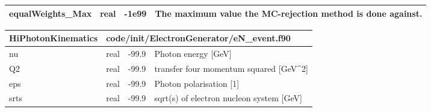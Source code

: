 \documentclass{article}
\begin{document}
\begin{longtable}{llll}
\midrule
equalWeights\_Max & \begin{minipage}[t]{2cm}real\end{minipage} & \begin{minipage}[t]{2cm}-1e99\end{minipage} & \begin{minipage}[t]{12cm}The maximum value the MC-rejection method is done against.\end{minipage}\\*
\bottomrule
\end{longtable}
{ }




\begin{longtable}{llll}
\toprule
\textbf{\large{HiPhotonKinematics}} & \multicolumn{3}{l}{\footnotesize{code/init/ElectronGenerator/eN\_event.f90}}\\*
\midrule
\endfirsthead
\midrule
\endhead
nu & \begin{minipage}[t]{2cm}real\end{minipage} & \begin{minipage}[t]{2cm}-99.9\end{minipage} & \begin{minipage}[t]{12cm}Photon energy [GeV]\end{minipage}\\*
\midrule
Q2 & \begin{minipage}[t]{2cm}real\end{minipage} & \begin{minipage}[t]{2cm}-99.9\end{minipage} & \begin{minipage}[t]{12cm}transfer four momentum squared [GeV\^{}2]\end{minipage}\\*
\midrule
eps & \begin{minipage}[t]{2cm}real\end{minipage} & \begin{minipage}[t]{2cm}-99.9\end{minipage} & \begin{minipage}[t]{12cm}Photon polarisation [1]\end{minipage}\\*
\midrule
srts & \begin{minipage}[t]{2cm}real\end{minipage} & \begin{minipage}[t]{2cm}-99.9\end{minipage} & \begin{minipage}[t]{12cm}sqrt(s) of electron nucleon system [GeV]\end{minipage}\\*

\end{longtable}
\end{document}

